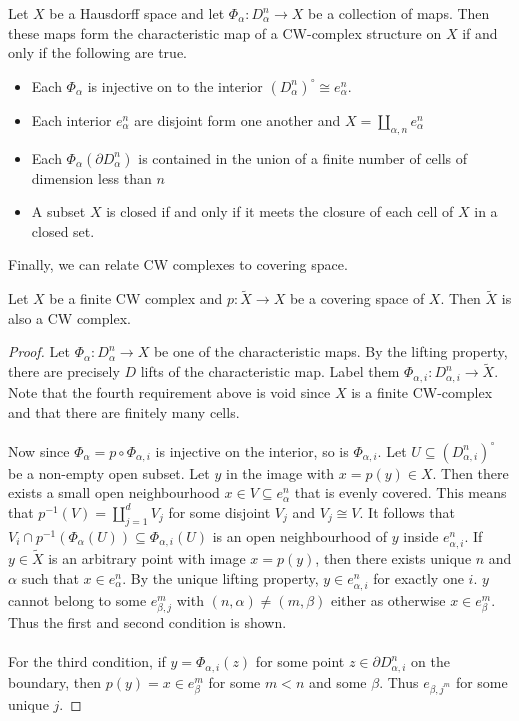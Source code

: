 \documentclass[a4paper]{article}
\begin{document}
\begin{thm}{}{} Let $X$ be a Hausdorff space and let $\Phi_\alpha:D_\alpha^n\to X$ be a collection of maps. Then these maps form the characteristic map of a CW-complex structure on $X$ if and only if the following are true. 
\begin{itemize}
\item Each $\Phi_\alpha$ is injective on to the interior $(D_\alpha^n)^\circ\cong e_{\alpha}^n$. 
\item Each interior $e_\alpha^n$ are disjoint form one another and $X=\coprod_{\alpha,n}e_{\alpha}^n$
\item Each $\Phi_\alpha(\partial D_\alpha^n)$ is contained in the union of a finite number of cells of dimension less than $n$
\item A subset $X$ is closed if and only if it meets the closure of each cell of $X$ in a closed set. 
\end{itemize}
\end{thm}

Finally, we can relate CW complexes to covering space. 

\begin{prp}{}{} Let $X$ be a finite CW complex and $p:\tilde{X}\to X$ be a covering space of $X$. Then $\tilde{X}$ is also a CW complex. \tcbline
\begin{proof}
Let $\Phi_\alpha:D_\alpha^n\to X$ be one of the characteristic maps. By the lifting property, there are precisely $D$ lifts of the characteristic map. Label them $\Phi_{\alpha,i}:D_{\alpha,i}^n\to\tilde{X}$. Note that the fourth requirement above is void since $X$ is a finite CW-complex and that there are finitely many cells. \\~\\

Now since $\Phi_{\alpha}=p\circ\Phi_{\alpha,i}$ is injective on the interior, so is $\Phi_{\alpha,i}$. Let $U\subseteq(D_{\alpha,i}^n)^\circ$ be a non-empty open subset. Let $y$ in the image with $x=p(y)\in X$. Then there exists a small open neighbourhood $x\in V\subseteq e_\alpha^n$ that is evenly covered. This means that $p^{-1}(V)=\coprod_{j=1}^dV_j$ for some disjoint $V_j$ and $V_j\cong V$. It follows that $V_i\cap p^{-1}(\Phi_\alpha(U))\subseteq\Phi_{\alpha,i}(U)$ is an open neighbourhood of $y$ inside $e_{\alpha,i}^n$. If $y\in\tilde{X}$ is an arbitrary point with image $x=p(y)$, then there exists unique $n$ and $\alpha$ such that $x\in e_{\alpha}^n$. By the unique lifting property, $y\in e_{\alpha,i}^n$ for exactly one $i$. $y$ cannot belong to some $e_{\beta,j}^m$ with $(n,\alpha)\neq(m,\beta)$ either as otherwise $x\in e_\beta^m$. Thus the first and second condition is shown. \\~\\

For the third condition, if $y=\Phi_{\alpha,i}(z)$ for some point $z\in\partial D_{\alpha,i}^n$ on the boundary, then $p(y)=x\in e_\beta^m$ for some $m<n$ and some $\beta$. Thus $e_{\beta,j^m}$ for some unique $j$. 
\end{proof}
\end{prp}
\end{document}
